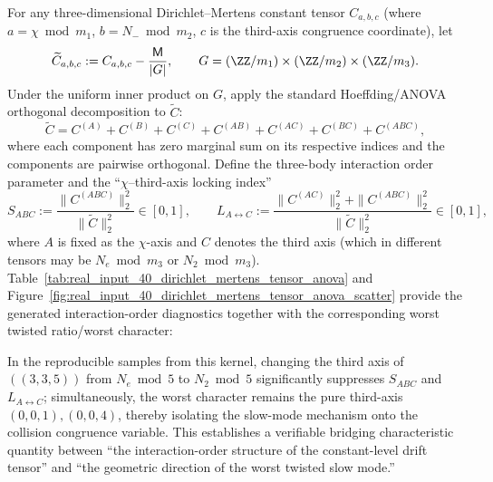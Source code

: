 \begin{remark}\label{rem:dirichlet-mertens-anova-fingerprint}
For any three-dimensional Dirichlet--Mertens constant tensor \(C_{a,b,c}\) (where \(a=\chi\bmod m_1\), \(b=N_-\bmod m_2\), \(c\) is the third-axis congruence coordinate), let
$$
\widetilde C_{a,b,c}:=C_{a,b,c}-\frac{\mathsf{M}}{|G|},
\qquad
G=(\ZZ/m_1)\times(\ZZ/m_2)\times(\ZZ/m_3).
$$
Under the uniform inner product on \(G\), apply the standard Hoeffding/ANOVA orthogonal decomposition to \(\widetilde C\):
$$
\widetilde C
=C^{(A)}+C^{(B)}+C^{(C)}+C^{(AB)}+C^{(AC)}+C^{(BC)}+C^{(ABC)},
$$
where each component has zero marginal sum on its respective indices and the components are pairwise orthogonal.
Define the three-body interaction order parameter and the ``\(\chi\)--third-axis locking index''
$$
S_{ABC}:=\frac{\|C^{(ABC)}\|_2^2}{\|\widetilde C\|_2^2}\in[0,1],
\qquad
L_{A\leftrightarrow C}:=\frac{\|C^{(AC)}\|_2^2+\|C^{(ABC)}\|_2^2}{\|\widetilde C\|_2^2}\in[0,1],
$$
where \(A\) is fixed as the \(\chi\)-axis and \(C\) denotes the third axis (which in different tensors may be \(N_e\bmod m_3\) or \(N_2\bmod m_3\)).
Table~\ref{tab:real_input_40_dirichlet_mertens_tensor_anova} and Figure~\ref{fig:real_input_40_dirichlet_mertens_tensor_anova_scatter} provide the generated interaction-order diagnostics together with the corresponding worst twisted ratio/worst character:


\par
In the reproducible samples from this kernel, changing the third axis of \(((3,3,5))\) from \(N_e\bmod 5\) to \(N_2\bmod 5\) significantly suppresses \(S_{ABC}\) and \(L_{A\leftrightarrow C}\);
simultaneously, the worst character remains the pure third-axis \((0,0,1),(0,0,4)\), thereby isolating the slow-mode mechanism onto the collision congruence variable.
This establishes a verifiable bridging characteristic quantity between ``the interaction-order structure of the constant-level drift tensor'' and ``the geometric direction of the worst twisted slow mode.''
\end{remark}

